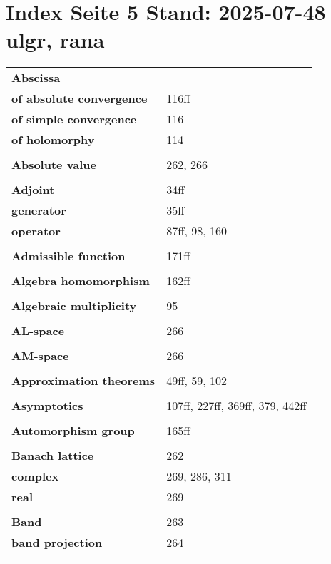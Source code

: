 \documentclass[9pt]{scrartcl}
\begin{document}
\pagestyle{empty}
\section*{Index Seite 5 Stand: 2025-07-48 ulgr, rana}

\noindent
\begin{minipage}[t]{0.48\textwidth}
\begin{longtable}{>{\bfseries}p{4cm}p{3cm}}

\textbf{Abscissa} & \\
\quad of absolute convergence & 116ff \\
\quad of simple convergence & 116 \\
\quad of holomorphy & 114 \\
\\
\textbf{Absolute value} & 262, 266 \\
\\
\textbf{Adjoint} & 34ff \\
\quad generator & 35ff \\
\quad operator & 87ff, 98, 160 \\
\\
\textbf{Admissible function} & 171ff \\
\\
\textbf{Algebra homomorphism} & 162ff \\
\\
\textbf{Algebraic multiplicity} & 95 \\
\\
\textbf{AL-space} & 266 \\
\\
\textbf{AM-space} & 266 \\
\\
\textbf{Approximation theorems} & 49ff, 59, 102 \\
\\
\textbf{Asymptotics} & 107ff, 227ff, 369ff, 379, 442ff \\
\\
\textbf{Automorphism group} & 165ff \\
\\
\textbf{Banach lattice} & 262 \\
\quad complex & 269, 286, 311 \\
\quad real & 269 \\
\\
\textbf{Band} & 263 \\
\quad band projection & 264 \\
\\

\end{longtable}
\end{minipage}
\end{document}
